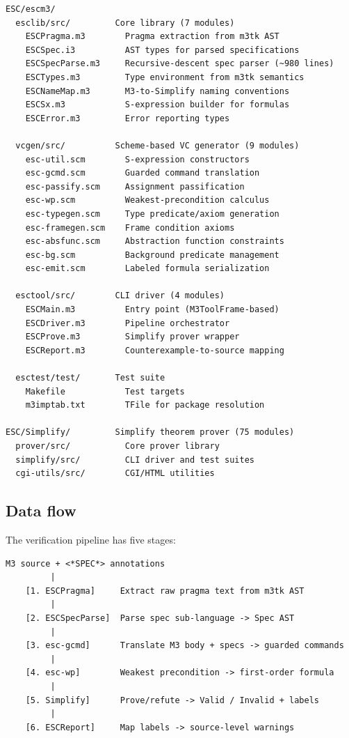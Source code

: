 \documentclass[11pt]{article}
\begin{document}
\begin{lstlisting}[language={}]
ESC/escm3/
  esclib/src/         Core library (7 modules)
    ESCPragma.m3        Pragma extraction from m3tk AST
    ESCSpec.i3          AST types for parsed specifications
    ESCSpecParse.m3     Recursive-descent spec parser (~980 lines)
    ESCTypes.m3         Type environment from m3tk semantics
    ESCNameMap.m3       M3-to-Simplify naming conventions
    ESCSx.m3            S-expression builder for formulas
    ESCError.m3         Error reporting types

  vcgen/src/          Scheme-based VC generator (9 modules)
    esc-util.scm        S-expression constructors
    esc-gcmd.scm        Guarded command translation
    esc-passify.scm     Assignment passification
    esc-wp.scm          Weakest-precondition calculus
    esc-typegen.scm     Type predicate/axiom generation
    esc-framegen.scm    Frame condition axioms
    esc-absfunc.scm     Abstraction function constraints
    esc-bg.scm          Background predicate management
    esc-emit.scm        Labeled formula serialization

  esctool/src/        CLI driver (4 modules)
    ESCMain.m3          Entry point (M3ToolFrame-based)
    ESCDriver.m3        Pipeline orchestrator
    ESCProve.m3         Simplify prover wrapper
    ESCReport.m3        Counterexample-to-source mapping

  esctest/test/       Test suite
    Makefile            Test targets
    m3imptab.txt        TFile for package resolution

ESC/Simplify/         Simplify theorem prover (75 modules)
  prover/src/           Core prover library
  simplify/src/         CLI driver and test suites
  cgi-utils/src/        CGI/HTML utilities
\end{lstlisting}

\subsection{Data flow}

The verification pipeline has five stages:

\begin{lstlisting}[language={}]
  M3 source + <*SPEC*> annotations
         |
    [1. ESCPragma]     Extract raw pragma text from m3tk AST
         |
    [2. ESCSpecParse]  Parse spec sub-language -> Spec AST
         |
    [3. esc-gcmd]      Translate M3 body + specs -> guarded commands
         |
    [4. esc-wp]        Weakest precondition -> first-order formula
         |
    [5. Simplify]      Prove/refute -> Valid / Invalid + labels
         |
    [6. ESCReport]     Map labels -> source-level warnings
\end{lstlisting}
\end{document}
